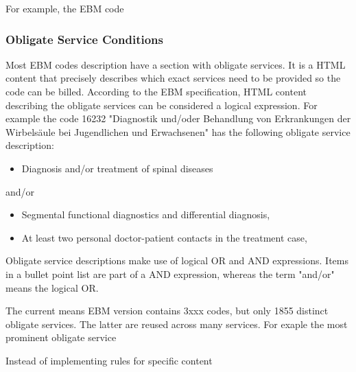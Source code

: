 For example, the EBM code


\subsubsection{}



\subsubsection{Obligate Service Conditions}
Most EBM codes description have a section with obligate services.
It is a HTML content that precisely describes which exact services need to be provided so the code can be billed.
According to the EBM specification, HTML content describing the obligate services can be considered a logical expression.
For example the code 16232 "Diagnostik und/oder Behandlung von Erkrankungen der Wirbelsäule bei Jugendlichen und Erwachsenen" has the following obligate service description:


\begin{itemize}
    \item Diagnosis and/or treatment of spinal diseases
\end{itemize}
and/or
\begin{itemize}
    \item Segmental functional diagnostics and differential diagnosis,
    \item At least two personal doctor-patient contacts in the treatment case,
\end{itemize}

Obligate service descriptions make use of logical OR and AND expressions.
Items in a bullet point list are part of a AND expression, whereas the term "and/or" means the logical OR.

The current means EBM version contains 3xxx codes, but only 1855 distinct obligate services.
The latter are reused across many services. For exaple the most prominent obligate service

Instead of implementing rules for specific content


\